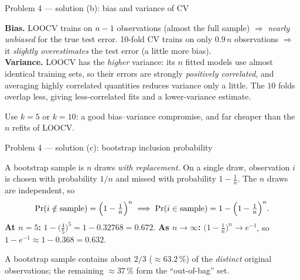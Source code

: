 \documentclass[aspectratio=169,11pt]{beamer}
\begin{document}
\begin{frame}{Problem 4 --- solution (b): bias and variance of CV}
  \begin{solutionbox}
    \textbf{Bias.} LOOCV trains on $n-1$ observations (almost the full sample) $\Rightarrow$
    \emph{nearly unbiased} for the true test error. 10-fold CV trains on only $0.9\,n$
    observations $\Rightarrow$ it \emph{slightly overestimates} the test error (a little
    more bias).\\[1mm]
    \textbf{Variance.} LOOCV has the \emph{higher} variance: its $n$ fitted models use
    almost identical training sets, so their errors are strongly \emph{positively
    correlated}, and averaging highly correlated quantities reduces variance only a little.
    The $10$ folds overlap less, giving less-correlated fits and a lower-variance estimate.
  \end{solutionbox}
  \begin{takeaway}[Practice]
    Use $k=5$ or $k=10$: a good bias--variance compromise, and far cheaper than the $n$
    refits of LOOCV.
  \end{takeaway}
\end{frame}

\begin{frame}{Problem 4 --- solution (c): bootstrap inclusion probability}
  \begin{solutionbox}
    A bootstrap sample is $n$ draws \emph{with replacement}. On a single draw, observation
    $i$ is chosen with probability $1/n$ and missed with probability $1-\tfrac{1}{n}$. The
    $n$ draws are independent, so
    \[
      \Pr(i\notin\text{sample})=\Bigl(1-\tfrac{1}{n}\Bigr)^{n}
      \;\Longrightarrow\;
      \Pr(i\in\text{sample})=1-\Bigl(1-\tfrac{1}{n}\Bigr)^{n}.
    \]
    \textbf{At $n=5$:}\quad
    $1-\bigl(\tfrac{4}{5}\bigr)^{5}=1-0.32768=\mathbf{0.672}.$
    \quad\textbf{As $n\to\infty$:}\quad
    $\bigl(1-\tfrac{1}{n}\bigr)^{n}\to e^{-1}$, so
    $1-e^{-1}\approx 1-0.368=\mathbf{0.632}.$
  \end{solutionbox}
  \begin{takeaway}
    A bootstrap sample contains about $2/3$ ($\approx 63.2\,\%$) of the \emph{distinct}
    original observations; the remaining $\approx 37\,\%$ form the ``out-of-bag'' set.
  \end{takeaway}
\end{frame}
\end{document}
